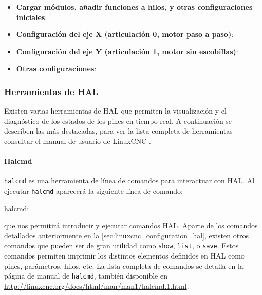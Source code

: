 \documentclass[english,spanish,a4paper,11pt]{article}
\begin{document}
\begin{itemize}
    \item \textbf{Cargar módulos, añadir funciones a hilos, y otras configuraciones iniciales}:

    \item \textbf{Configuración del eje X (articulación 0, motor paso a paso)}:

    \item \textbf{Configuración del eje Y (articulación 1, motor sin escobillas)}:

    \item \textbf{Otras configuraciones}:
\end{itemize}


\subsubsection{Herramientas de HAL}

Existen varias herramientas de HAL que permiten la visualización y el diagnóstico de los estados de los pines en tiempo real. A continuación se describen las más destacadas, para ver la lista completa de herramientas consultar el manual de usuario de LinuxCNC \cite{linuxcncdoc}.

\paragraph{Halcmd}\hfill\medskip

\texttt{halcmd} es una herramienta de línea de comandos para interactuar con \ac{HAL}. Al ejecutar \texttt{halcmd} aparecerá la siguiente línea de comando:
%
\begin{listingbox}[]
halcmd:
\end{listingbox}
%
\noindent
que nos permitirá introducir y ejecutar comandos \ac{HAL}. Aparte de los comandos detallados anteriormente en la \cref{sec:linuxcnc_configuration_hal}, existen otros comandos que pueden ser de gran utilidad como \texttt{show}, \texttt{list}, o \texttt{save}. Estos comandos permiten imprimir los distintos elementos definidos en \ac{HAL} como pines, parámetros, hilos, etc. La lista completa de comandos se detalla en la página de manual de \texttt{halcmd}, también disponible en \url{http://linuxcnc.org/docs/html/man/man1/halcmd.1.html}.
\end{document}

